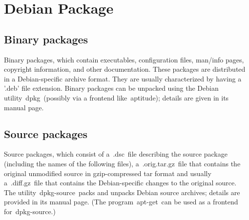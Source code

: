\section{Debian Package}

\subsection{Binary packages}
Binary packages, which contain executables, configuration files, man/info pages, copyright information, and other documentation. These packages are distributed in a Debian-specific archive format. They are usually characterized by having a '.deb' file extension. Binary packages can be unpacked using the Debian utility dpkg (possibly via a frontend like aptitude); details are given in its manual page.
\subsection{Source packages}
Source packages, which consist of a .dsc file describing the source package (including the names of the following files), a .orig.tar.gz file that contains the original unmodified source in gzip-compressed tar format and usually a .diff.gz file that contains the Debian-specific changes to the original source. The utility dpkg-source packs and unpacks Debian source archives; details are provided in its manual page. (The program apt-get can be used as a frontend for dpkg-source.)
\subsection{}
